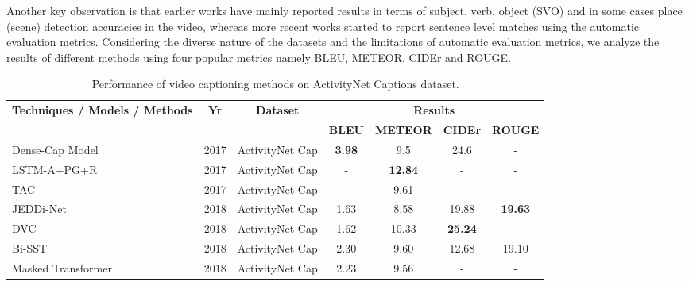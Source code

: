 \documentclass[10pt,journal,compsoc]{IEEEtran}
\begin{document}
Another key observation is that earlier works have mainly reported results in terms of subject, verb, object (SVO) and in some cases place (scene) detection accuracies in the video, whereas more recent works started to report sentence level matches using the automatic evaluation metrics. Considering the diverse nature of the datasets and the limitations of automatic evaluation metrics, we analyze the results of different methods using four popular metrics namely BLEU, METEOR, CIDEr and ROUGE. 

\begin{table*}[htbp]
  \centering
  \small
  \setlength{\tabcolsep}{10.0pt}       %

\caption{Performance of video captioning methods on ActivityNet Captions dataset.}
\vspace{-2mm}
     \begin{tabular}{|p{15.43em}|c|c|c|c|c|c|}
    \hline
    \multirow{2}[1]{*}{\textbf{Techniques / Models / Methods}} & \multirow{2}[1]{*}{\textbf{Yr}} & \multirow{2}[1]{*}{\textbf{Dataset}} & \multicolumn{4}{c|}{\textbf{Results}} \\
\cline{4-7}    \multicolumn{1}{|l|}{} & & & \textbf{BLEU} & \textbf{METEOR} & \textbf{CIDEr} & \textbf{ROUGE} \\
    \hline
     Dense-Cap Model~\cite{krishna2017dense} & 2017  & ActivityNet Cap & \textbf{3.98}  & 9.5   & 24.6  & - \\
    \hline
    LSTM-A+PG+R~\cite{yaomsr} & 2017  & ActivityNet Cap & -  & \textbf{12.84} & - & - \\
    \hline
     TAC \cite{ruccmu} & 2017  & ActivityNet Cap & - & 9.61 & - & - \\
    \hline
    JEDDi-Net~\cite{xu2018joint} & 2018 & ActivityNet Cap & 1.63 & 8.58 & 19.88 & \textbf{19.63} \\
    \hline 
    DVC~\cite{li2018jointly} & 2018 & ActivityNet Cap & 1.62 & 10.33 & \textbf{25.24} & - \\
    \hline
    Bi-SST~\cite{wang2018bidirectional} & 2018 & ActivityNet Cap & 2.30 & 9.60 & 12.68 & 19.10 \\
    \hline
    Masked Transformer~\cite{zhou2018end} & 2018 & ActivityNet Cap & 2.23 & 9.56 & - & - \\
    \hline
    \end{tabular}%
  \label{tab:activitynetcapresults}%
 \end{table*}%
\end{document}
